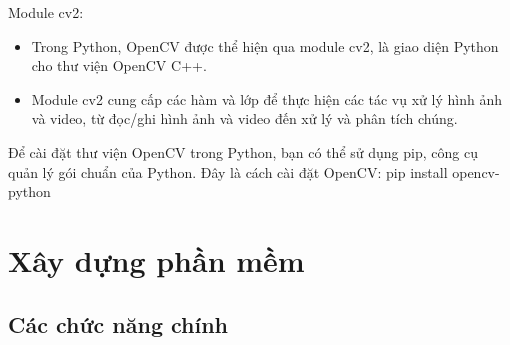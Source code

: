 \documentclass[a4paper]{article}
\begin{document}
    \hspace*{0.5cm} Module cv2:
    \begin{itemize}
        \item Trong Python, OpenCV được thể hiện qua module cv2, là giao diện Python cho thư viện OpenCV C++.
        \item Module cv2 cung cấp các hàm và lớp để thực hiện các tác vụ xử lý hình ảnh và video, từ đọc/ghi hình ảnh và video đến xử lý và phân tích chúng.
    \end{itemize}

    \hspace*{0.5cm} Để cài đặt thư viện OpenCV trong Python, bạn có thể sử dụng pip, công cụ quản lý gói chuẩn của Python. Đây là cách cài đặt OpenCV: pip install opencv-python
    
\newpage
\section{Xây dựng phần mềm}
\subsection{Các chức năng chính}
\end{document}
